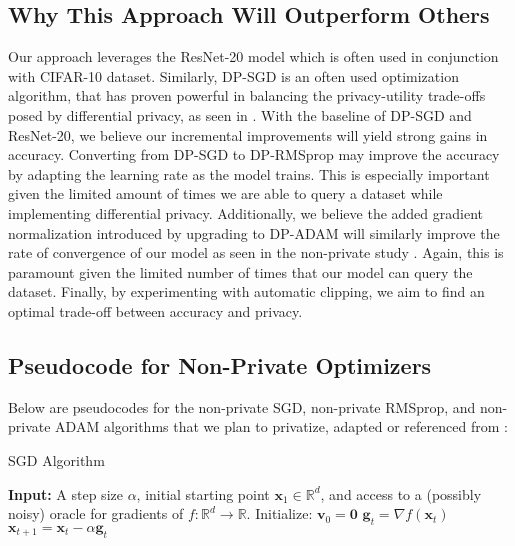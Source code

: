 \subsection{Why This Approach Will Outperform Others}\label{subsec:why-this-approach-will-outperform-others}
Our approach leverages the ResNet-20 model which is often used in conjunction with
CIFAR-10 dataset. 
Similarly, DP-SGD is an often used optimization algorithm, that has proven powerful in balancing the privacy-utility trade-offs posed
by differential privacy, as seen in \cite{Abadi_2016_DeepLearningDifferentialPrivacy}. With the baseline
of DP-SGD and ResNet-20, we believe our incremental improvements will yield strong gains in 
accuracy. 
Converting from DP-SGD to DP-RMSprop may improve the accuracy by adapting the learning rate as the
model trains. This is especially important given the limited amount of times we are able to
query a dataset while implementing differential privacy.
Additionally, we believe the added gradient normalization introduced by upgrading to DP-ADAM will
similarly improve the rate of convergence of our model as seen in the non-private study \cite{DBLP:journals/corr/abs-1807-06766}. Again, this is paramount given the 
limited number of times that our model can query the dataset. 
Finally, by experimenting with automatic clipping, we aim to 
find an optimal trade-off between accuracy and privacy. 

\subsection{Pseudocode for Non-Private Optimizers}\label{subsec:pseudo-code-for-non-private-optimizers}
Below are pseudocodes for the non-private SGD, non-private RMSprop, and non-private ADAM algorithms that we plan to privatize, adapted or referenced from \cite{DBLP:journals/corr/abs-1807-06766}:
    \begin{algorithm}
        \caption{SGD Algorithm}
        \label{alg:sgd}
        \begin{algorithmic}[1]
            \State \textbf{Input:} A step size $\alpha$, initial starting point $\mathbf{x}_1 \in \mathbb{R}^d$, and access to a (possibly noisy) oracle for gradients of $f : \mathbb{R}^d \rightarrow \mathbb{R}$.
                \State Initialize: $\mathbf{v}_0 = \mathbf{0}$
                    \State $\mathbf{g}_t = \nabla f(\mathbf{x}_t)$
                    \State $\mathbf{x}_{t+1} = \mathbf{x}_t - \alpha \mathbf{g}_t$
                \EndFor
            \EndFunction
    \end{algorithmic}
    \end{algorithm}
    \vspace{-1cm}

